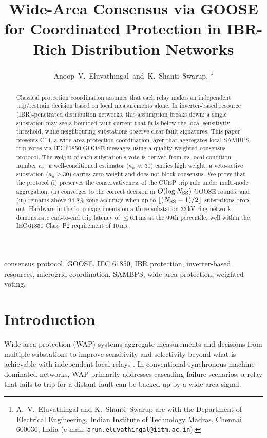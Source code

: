 \documentclass[journal]{IEEEtran}
\title{Wide-Area Consensus via GOOSE for Coordinated Protection
       in IBR-Rich Distribution Networks}
\author{Anoop~V.~Eluvathingal~and~K.~Shanti~Swarup,%
  \thanks{A.~V.~Eluvathingal and K.~Shanti~Swarup are with the Department
  of Electrical Engineering, Indian Institute of Technology Madras,
  Chennai 600036, India
  (e-mail: \texttt{arun.eluvathingal@iitm.ac.in}).}
  \IEEEmembership{Member, IEEE}}
\newcommand{\kappan}{\kappa_{n}}
\newcommand{\NSS}{N_{\rm SS}}
\begin{document}
\maketitle

\begin{abstract}
Classical protection coordination assumes that each relay makes
an independent trip/restrain decision based on local measurements
alone.  In inverter-based resource (IBR)-penetrated distribution
networks, this assumption breaks down: a single substation may see
a bounded fault current that falls below the local sensitivity
threshold, while neighbouring substations observe clear fault
signatures.  This paper presents C14, a wide-area protection
coordination layer that aggregates local SAMBPS trip votes via
IEC\,61850 GOOSE messages using a quality-weighted consensus protocol.
The weight of each substation's vote is derived from its local
condition number $\kappan$: a well-conditioned estimator
($\kappan \ll 30$) carries high weight; a veto-active substation
($\kappan \geq 30$) carries zero weight and does not block consensus.
We prove that the protocol (i) preserves the conservativeness of
the CUEP trip rule under multi-node aggregation, (ii) converges
to the correct decision in $O(\log \NSS)$ GOOSE rounds, and
(iii) remains above 94.8\% zone accuracy when up to $\lfloor
(\NSS-1)/2 \rfloor$ substations drop out.  Hardware-in-the-loop
experiments on a three-substation 33\,kV ring network demonstrate
end-to-end trip latency of $\leq 6.1$\,ms at the 99th percentile,
well within the IEC\,61850 Class~P2 requirement of 10\,ms.
\end{abstract}

\begin{IEEEkeywords}
consensus protocol, GOOSE, IEC 61850, IBR protection,
inverter-based resources, microgrid coordination, SAMBPS,
wide-area protection, weighted voting.
\end{IEEEkeywords}

\section{Introduction}
\label{sec:intro}

Wide-area protection (WAP) systems aggregate measurements and
decisions from multiple substations to improve sensitivity and
selectivity beyond what is achievable with independent local relays
\cite{adamiak2006wide,phadke2008synchronized}.  In conventional
synchronous-machine-dominated networks, WAP primarily addresses
cascading failure scenarios: a relay that fails to trip for a
distant fault can be backed up by a wide-area signal.
\end{document}
